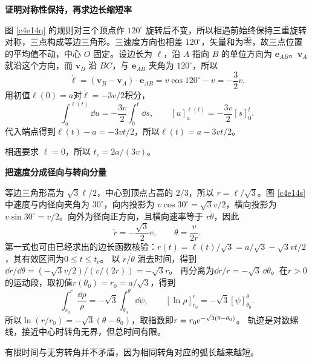 \begin{solution}\textbf{证明对称性保持，再求边长缩短率}\par\nobreak
图 \ref{c4e14q} 的规则对三个顶点作 $120^\circ$ 旋转后不变，所以相遇前始终保持三重旋转对称，三点构成等边三角形。三速度方向也相差 $120^\circ$，矢量和为零，故三点位置的平均值不动，中心 $O$ 固定。设边长为 $\ell$，沿 $A$ 指向 $B$ 的单位方向为 $\bm e_{AB}$。$\bm v_A$ 就沿这个方向，而 $\bm v_B$ 沿 $BC$，与 $\bm e_{AB}$ 夹角为 $120^\circ$，所以
\[
 \dot\ell=(\bm v_B-\bm v_A)\cdot\bm e_{AB}
 =v\cos120^\circ-v=-\frac32v.
\]
用初值$\ell(0)=a$对$\dot\ell=-3v/2$积分，
\[
\int_a^{\ell(t)}\dd u=-\frac{3v}{2}\int_0^t\dd s,
\qquad [u]_a^{\ell(t)}=-\frac{3v}{2}[s]_0^t.
\]
代入端点得到$\ell(t)-a=-3vt/2$，所以$\ell(t)=a-3vt/2$。

相遇要求 $\ell=0$，所以 $\boxed{t_c=2a/(3v)}$。



\par\medskip{}\noindent\textbf{把速度分成径向与转向分量}\par\nobreak
等边三角形高为 $\sqrt3\ell/2$，中心到顶点占高的 $2/3$，所以 $r=\ell/\sqrt3$。图 \ref{c4e14s} 中速度与内径向夹角为 $30^\circ$，向内投影为 $v\cos30^\circ=\sqrt3v/2$，横向投影为 $v\sin30^\circ=v/2$。向外为径向正方向，且横向速率等于 $r\dot\theta$，因此
\[
 \dot r=-\frac{\sqrt3}2v,\qquad
 \dot\theta=\frac{v}{2r}.
\]
第一式也可由已经求出的边长函数核验：$r(t)=\ell(t)/\sqrt3
=a/\sqrt3-\sqrt3vt/2$，其有效区间为$0\le t\le t_c$。
以 $\dot r/\dot\theta$ 消去时间，得到
$\dd r/\dd\theta=(-\sqrt3v/2)/(v/(2r))=-\sqrt3r$。
再分离为$\dd r/r=-\sqrt3\,\dd\theta$。在$r>0$的运动段，取初值$r(\theta_0)=r_0=a/\sqrt3$，得到
\[
\int_{r_0}^{r}\frac{\dd \rho}{\rho}
=-\sqrt3\int_{\theta_0}^{\theta}\dd\psi,
\qquad
[\ln\rho]_{r_0}^{r}=-\sqrt3[\psi]_{\theta_0}^{\theta}.
\]
所以$\ln(r/r_0)=-\sqrt3(\theta-\theta_0)$，取指数即$r=r_0\mathrm e^{-\sqrt3(\theta-\theta_0)}$。
轨迹是对数螺线，接近中心时转角无界，但总时间有限。

有限时间与无穷转角并不矛盾，因为相同转角对应的弧长越来越短。
\end{solution}

